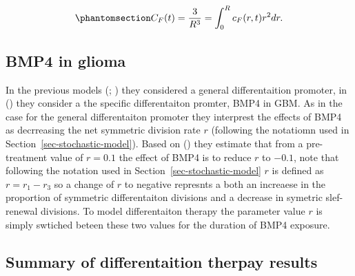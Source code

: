 \documentclass[
  letterpaper,
]{scrreprt}
\theoremstyle{definition}
\theoremstyle{remark}
\begin{document}
\begin{equation}\phantomsection\label{eq-bachman-CF2}{
C_F(t) = \frac{3}{R^3} = \int^R_0 c_F (r,t) r^2 dr.
}\end{equation}

\subsection{BMP4 in glioma}\label{bmp4-in-glioma}

In the previous models (; ) they considered a general differentaition promoter, in
() they consider a the
specific differentaiton promter, BMP4 in GBM. As in the case for the
general differentaiton promoter they interprest the effects of BMP4 as
decrreasing the net symmetric division rate \(r\) (following the
notatiomn used in Section~\ref{sec-stochastic-model}). Based on
() they estimate
that from a pre-treatment value of \(r = 0.1\) the effect of BMP4 is to
reduce \(r\) to \(-0.1\), note that following the notation used in
Section~\ref{sec-stochastic-model} \(r\) is defined as \(r = r_1-r_3\)
so a change of \(r\) to negative represnts a both an increaese in the
proportion of symmetric differentaiton divisions and a decrease in
symetric slef-renewal divisions. To model differentaiton therapy the
parameter value \(r\) is simply swtiched beteen these two values for the
duration of BMP4 exposure.

\subsection{Summary of differentaition therpay
results}\label{summary-of-differentaition-therpay-results}
\end{document}
